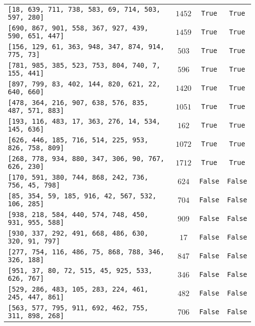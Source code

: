\documentclass[12pt]{scrartcl}
\begin{document}
\begin{table}[H]
{\begin{tabular}{lccc}
        \texttt{[18,  639, 711, 738, 583, 69,  714, 503, 597, 280]} & ${1452}$ & \texttt{True}  & \texttt{True}  \\
        \texttt{[690, 867, 901, 558, 367, 927, 439, 590, 651, 447]} & ${1459}$ & \texttt{True}  & \texttt{True}  \\
        \texttt{[156, 129, 61,  363, 948, 347, 874, 914, 775, 73]}  & ${503}$  & \texttt{True}  & \texttt{True}  \\
        \texttt{[781, 985, 385, 523, 753, 804, 740, 7,   155, 441]} & ${596}$  & \texttt{True}  & \texttt{True}  \\
        \texttt{[897, 799, 83,  402, 144, 820, 621, 22,  640, 660]} & ${1420}$ & \texttt{True}  & \texttt{True}  \\
        \texttt{[478, 364, 216, 907, 638, 576, 835, 487, 571, 883]} & ${1051}$ & \texttt{True}  & \texttt{True}  \\
        \texttt{[193, 116, 483, 17,  363, 276, 14,  534, 145, 636]} & ${162}$  & \texttt{True}  & \texttt{True}  \\
        \texttt{[626, 446, 185, 716, 514, 225, 953, 826, 758, 809]} & ${1072}$ & \texttt{True}  & \texttt{True}  \\
        \texttt{[268, 778, 934, 880, 347, 306, 90,  767, 626, 230]} & ${1712}$ & \texttt{True}  & \texttt{True}  \\
        \texttt{[170, 591, 380, 744, 868, 242, 736, 756, 45,  798]} & ${624}$  & \texttt{False} & \texttt{False} \\
        \texttt{[85,  354, 59,  185, 916, 42,  567, 532, 106, 285]} & ${704}$  & \texttt{False} & \texttt{False} \\
        \texttt{[938, 218, 584, 440, 574, 748, 450, 931, 955, 588]} & ${909}$  & \texttt{False} & \texttt{False} \\
        \texttt{[930, 337, 292, 491, 668, 486, 630, 320, 91,  797]} & ${17}$   & \texttt{False} & \texttt{False} \\
        \texttt{[277, 754, 116, 486, 75,  868, 788, 346, 326, 188]} & ${847}$  & \texttt{False} & \texttt{False} \\
        \texttt{[951, 37,  80,  72,  515, 45,  925, 533, 626, 767]} & ${346}$  & \texttt{False} & \texttt{False} \\
        \texttt{[529, 286, 483, 105, 283, 224, 461, 245, 447, 861]} & ${482}$  & \texttt{False} & \texttt{False} \\
        \texttt{[563, 577, 795, 911, 692, 462, 755, 311, 898, 268]} & ${706}$  & \texttt{False} & \texttt{False} \\

\end{tabular}}
\end{table}
\end{document}
